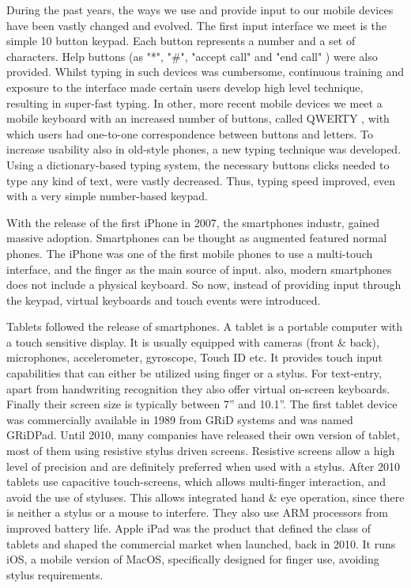 During the past years, the ways we use and provide input to our mobile devices have been vastly changed and evolved. The first input interface we meet is the simple 10 button keypad. Each button represents a number and a set of characters. Help buttons (as "*", "\#", "accept call" and "end call" ) were also provided. Whilst typing in such devices was cumbersome, continuous training and exposure to the interface made certain users develop high level technique, resulting in super-fast typing. 
In other, more recent mobile devices we meet a mobile keyboard with an increased number of buttons, called QWERTY \cite{qwerty}, with which users had one-to-one correspondence between buttons and letters.
To increase usability also in old-style phones, a new typing technique was developed. Using a dictionary-based typing system, the necessary buttons clicks needed to type any kind of text, were vastly decreased. Thus, typing speed improved, even with a very simple number-based keypad. 

With the release of the first iPhone \cite{iphone} in 2007, the smartphones industr, gained massive adoption. Smartphones can be thought as augmented featured normal phones. The iPhone was one of the first mobile phones to use a multi-touch interface, and the finger as the main source of input. also, modern smartphones does not include a physical keyboard. 
So now, instead of providing input through the keypad, virtual keyboards and touch events were introduced. 

Tablets followed the release of smartphones. A tablet is a portable computer with a touch sensitive display. It is usually equipped with cameras (front \& back), microphones, accelerometer, gyroscope, Touch ID \cite{touchID} etc. It provides touch input capabilities that can either be utilized using finger or a stylus. For text-entry, apart from handwriting recognition they also offer virtual on-screen keyboards. Finally their screen size is typically between 7'' and 10.1''.
The first tablet device was commercially available in 1989 from GRiD systems and was named GRiDPad. Until 2010, many companies have released their own version of tablet, most of them using resistive stylus driven screens. Resistive screens allow a high level of precision and are definitely preferred when used with a stylus.
After 2010 tablets use capacitive touch-screens, which allows multi-finger interaction, and avoid the use of styluses. This allows integrated hand \& eye operation, since there is neither a stylus or a mouse to interfere. They also use ARM processors from improved battery life. Apple iPad was the product that defined the class of tablets and shaped the commercial market when launched, back in 2010. It runs iOS, a mobile version of MacOS, specifically designed for finger use, avoiding stylus requirements. 

